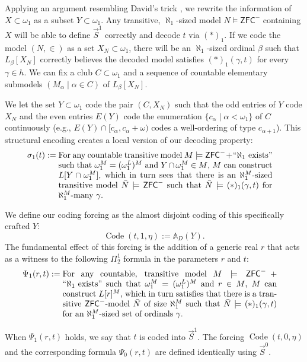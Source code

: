 \documentclass{article}
\theoremstyle{plain}
\theoremstyle{definition}
\newcommand{\code}{\operatorname{Code}}
\begin{document}
Applying an argument resembling David's trick \cite{david1982very}, we rewrite the information of $X \subset \omega_1$ as a subset $Y \subset \omega_1$. Any transitive, $\aleph_1$-sized model $N \models \mathsf{ZFC}^-$ containing $X$ will be able to define $\vec{S}^1$ correctly and decode $t$ via $(\ast)_1$. If we code the model $(N, \in)$ as a set $X_N \subset \omega_1$, there will be an $\aleph_1$-sized ordinal $\beta$ such that $L_\beta[X_N]$ correctly believes the decoded model satisfies $(\ast)_1(\gamma, t)$ for every $\gamma \in h$. We can fix a club $C \subset \omega_1$ and a sequence of countable elementary submodels $(M_\alpha \mid \alpha \in C)$ of $L_\beta[X_N]$. 

We let the set $Y \subset \omega_1$ code the pair $(C, X_N)$ such that the odd entries of $Y$ code $X_N$ and the even entries $E(Y)$ code the enumeration $\{c_\alpha \mid \alpha < \omega_1\}$ of $C$ continuously (e.g., $E(Y) \cap [c_\alpha, c_\alpha+\omega)$ codes a well-ordering of type $c_{\alpha+1}$). This structural encoding creates a local version of our decoding property:
\begin{align*}
\sigma_1(t) := {} & \parbox[t]{0.75\textwidth}{For any countable transitive model $M \models \mathsf{ZFC}^- + \text{``}\aleph_1 \text{ exists''}$ such that $\omega_1^M=(\omega_1^L)^M$ and $Y \cap \omega_1^M \in M$, $M$ can construct $L[Y \cap \omega_1^M]$, which in turn sees that there is an $\aleph_1^M$-sized transitive model $\bar{N} \models \mathsf{ZFC}^-$ such that $\bar{N} \models (\ast)_1(\gamma, t)$ for $\aleph_1^M$-many $\gamma$.}
\end{align*}

We define our coding forcing as the almost disjoint coding of this specifically crafted $Y$:
\[ \code(t, 1, \eta) := \mathbb{A}_D(Y). \]
The fundamental effect of this forcing is the addition of a generic real $r$ that acts as a witness to the following $\Pi^1_2$ formula in the parameters $r$ and $t$:
\begin{align*}
\Psi_1(r, t) := {} & \parbox[t]{0.75\textwidth}{For any countable, transitive model $M \models \mathsf{ZFC}^- + \text{``}\aleph_1 \text{ exists''}$ such that $\omega_1^M = (\omega_1^L)^M$ and $r \in M$, $M$ can construct $L[r]^M$, which in turn satisfies that there is a transitive $\mathsf{ZFC}^-$-model $\bar{N}$ of size $\aleph_1^M$ such that $\bar{N} \models (\ast)_1(\gamma, t)$ for an $\aleph_1^M$-sized set of ordinals $\gamma$.}
\end{align*}

When $\Psi_1(r, t)$ holds, we say that $t$ is coded into $\vec{S}^1$. The forcing $\code(t,0,\eta)$ and the corresponding formula $\Psi_0(r, t)$ are defined identically using $\vec{S}^0$. 
\end{document}
